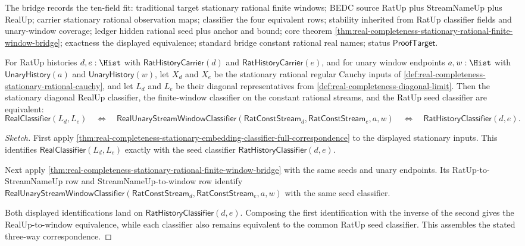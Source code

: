 The bridge records the ten-field fit: traditional target stationary rational
finite windows; BEDC source RatUp plus StreamNameUp plus RealUp; carrier
stationary rational observation maps; classifier the four equivalent rows;
stability inherited from RatUp classifier fields and unary-window coverage;
ledger hidden rational seed plus anchor and bound; core theorem
\autoref{thm:real-completeness-stationary-rational-finite-window-bridge};
exactness the displayed equivalence; standard bridge constant rational real
names; status $\mathsf{ProofTarget}$.

\begin{theorem}
\label{thm:real-completeness-stationary-diagonal-window-classifier-correspondence}
For RatUp histories $d,e:\Hist$ with $\mathsf{RatHistoryCarrier}(d)$ and
$\mathsf{RatHistoryCarrier}(e)$, and for unary window endpoints $a,w:\Hist$
with $\mathsf{UnaryHistory}(a)$ and $\mathsf{UnaryHistory}(w)$, let $X_d$ and
$X_e$ be the stationary rational regular Cauchy inputs of
\autoref{def:real-completeness-stationary-rational-cauchy}, and let $L_d$ and
$L_e$ be their diagonal representatives from
\autoref{def:real-completeness-diagonal-limit}. Then the stationary diagonal
RealUp classifier, the finite-window classifier on the constant rational
streams, and the RatUp seed classifier are equivalent:
$$
\mathsf{RealClassifier}(L_d,L_e)
\quad\Longleftrightarrow\quad
\mathsf{RealUnaryStreamWindowClassifier}(\mathsf{RatConstStream}_d,\mathsf{RatConstStream}_e,a,w)
\quad\Longleftrightarrow\quad
\mathsf{RatHistoryClassifier}(d,e).
$$
\end{theorem}

\begin{proof}[Sketch]
First apply
\autoref{thm:real-completeness-stationary-embedding-classifier-full-correspondence}
to the displayed stationary inputs. This identifies
$\mathsf{RealClassifier}(L_d,L_e)$ exactly with the seed classifier
$\mathsf{RatHistoryClassifier}(d,e)$.

Next apply
\autoref{thm:real-completeness-stationary-rational-finite-window-bridge} with
the same seeds and unary endpoints. Its RatUp-to-StreamNameUp row and
StreamNameUp-to-window row identify
$\mathsf{RealUnaryStreamWindowClassifier}(\mathsf{RatConstStream}_d,\mathsf{RatConstStream}_e,a,w)$
with the same seed classifier.

Both displayed identifications land on
$\mathsf{RatHistoryClassifier}(d,e)$. Composing the first identification with
the inverse of the second gives the RealUp-to-window equivalence, while each
classifier also remains equivalent to the common RatUp seed classifier. This
assembles the stated three-way correspondence.
\end{proof}

